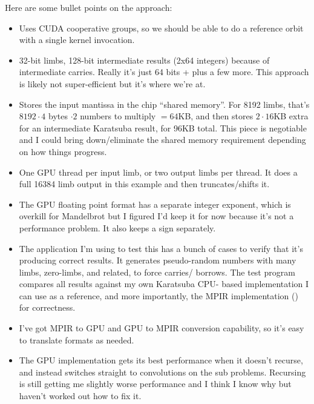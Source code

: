 Here are some bullet points on the approach:

\begin{itemize}

\item Uses CUDA cooperative groups, so we should be able to do a reference 
orbit with a single kernel invocation.

\item 32-bit limbs, 128-bit intermediate results (2x64 integers) because of 
intermediate carries.  Really it's just 64 bits + plus a few more.  This 
approach is likely not super-efficient but it's where we're at.

\item Stores the input mantissa in the chip ``shared memory''.  For 8192 limbs, 
that's $8192 \cdot 4$ bytes $\cdot 2$ numbers to multiply $= 64$KB, and then 
stores $2 \cdot 16$KB extra for an intermediate Karatsuba result, for 96KB 
total.  This piece is negotiable and I could bring down/eliminate the shared 
memory requirement depending on how things progress.

\item One GPU thread per input limb, or two output limbs per thread.  It does a 
full 16384 limb output in this example and then truncates/shifts it.

\item The GPU floating point format has a separate integer exponent, which is 
overkill for Mandelbrot but I figured I'd keep it for now because it's not a 
performance problem.  It also keeps a sign separately.

\item The application I'm using to test this has a bunch of cases to verify 
that it's producing correct results.  It generates pseudo-random numbers with 
many  limbs, zero-limbs, and related, to force carries/
borrows.  The test program compares all results against my own Karatsuba CPU-
based implementation I can use as a reference, and more importantly, the MPIR 
implementation () for correctness.

\item I've got MPIR to GPU and GPU to MPIR conversion capability, so it's easy 
to translate formats as needed.

\item The GPU implementation gets its best performance when it doesn't recurse, 
and instead switches straight to convolutions on the sub problems.  Recursing 
is still getting me slightly worse performance and I think I know why but 
haven't worked out how to fix it.

\end{itemize}

